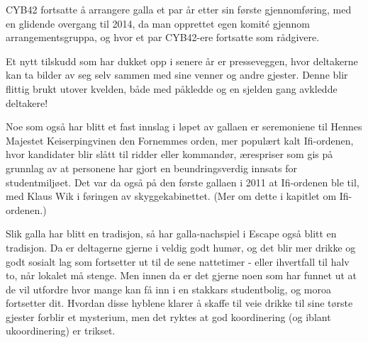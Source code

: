 CYB42 fortsatte å arrangere galla et par år etter sin første gjennomføring, med en glidende overgang til 2014, da man opprettet egen komité gjennom arrangementsgruppa, og hvor et par CYB42-ere fortsatte som rådgivere.

Et nytt tilskudd som har dukket opp i senere år er presseveggen, hvor deltakerne kan ta bilder av seg selv sammen med sine venner og andre gjester. Denne blir flittig brukt utover kvelden, både med påkledde og en sjelden gang avkledde deltakere!

Noe som også har blitt et fast innslag i løpet av gallaen er seremoniene til Hennes Majestet Keiserpingvinen den Fornemmes orden, mer populært kalt Ifi-ordenen, hvor kandidater blir slått til ridder eller kommandør, ærespriser som gis på grunnlag av at personene har gjort en beundringsverdig innsats for studentmiljøet. Det var da også på den første gallaen i 2011 at Ifi-ordenen ble til, med Klaus Wik i føringen av skyggekabinettet. (Mer om dette i kapitlet om Ifi-ordenen.)

Slik galla har blitt en tradisjon, så har galla-nachspiel i Escape også blitt en tradisjon. Da er deltagerne gjerne i veldig godt humør, og det blir mer drikke og godt sosialt lag som fortsetter ut til de sene nattetimer - eller ihvertfall til halv to, når lokalet må stenge. Men innen da er det gjerne noen som har funnet ut at de vil utfordre hvor mange kan få inn i en stakkars studentbolig, og moroa fortsetter dit. Hvordan disse hyblene klarer å skaffe til veie drikke til sine tørste gjester forblir et mysterium, men det ryktes at god koordinering (og iblant ukoordinering) er trikset.
